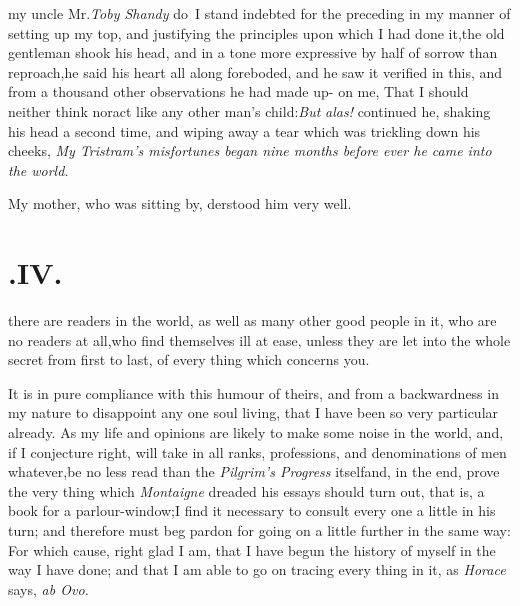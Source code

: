 \documentclass{article}
\begin{document}
 my uncle Mr.\@ \textit{Toby Shandy} do~I\break
stand indebted for the preceding\break
{}
\break
in my manner of
setting up my top, and justifying the principles upon which I had
done it,\tsk  the old gentleman shook his head, and in a tone more
expressive by half of sorrow than reproach,\tsk  he said his heart
all along foreboded, and he saw it verified in this, and from a
thousand other observations he had made up- on me, That I should
neither think nor\break act like any other man’s
child:\tsh  \textit{But} \textit{alas!} continued he, shaking his head a
second time, and wiping away a tear which was trickling down his
cheeks, \textit{My Tristram’s misfortunes began nine months before
ever he came into the world.}

\tsh My mother, who was sitting by,\break
{}
derstood him very well.

\section{.\enspace IV.}

 there are readers in the
world, as well as many other good people in it, who are no readers
at all,\tsk  who find themselves ill at ease, unless they are let
into the whole secret from first to last, of every thing which
concerns you.

It is in pure compliance with this humour of theirs, and from a
backwardness in my nature to disappoint any one soul living, that I
have been so very particular already. As my life and opinions are
likely to make some noise in the world, and, if I conjecture right,
will take in all ranks, professions, and denominations of men
whatever,\tsk  be no less read than the \textit{Pilgrim’s
Progress} itself\tsk  and, in the end, prove the very thing
which \textit{Montaigne} dreaded his essays should turn out, that is,
a book for a parlour-window;\tsk  I find it necessary to consult
every one a little in his turn; and therefore must beg pardon for going on a little
further in the same way:
For which cause, right glad I am, that I have begun the history of
myself in the way I have done; and that I am able to go on tracing
every thing in it, as \textit{Horace} says, \textit{ab Ovo.}
\end{document}

